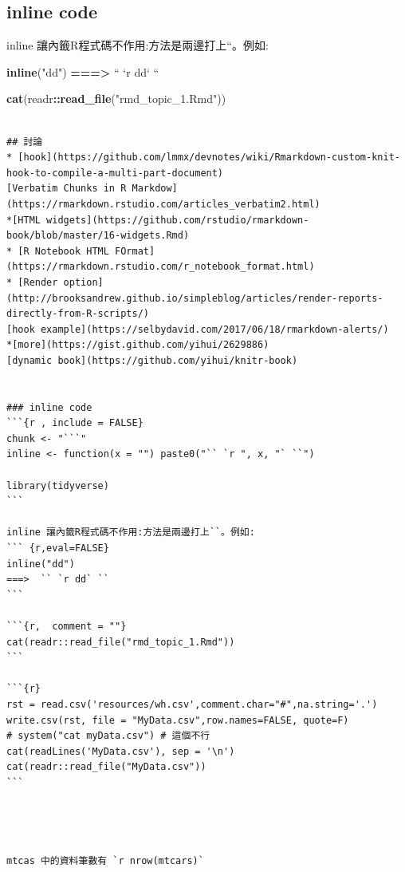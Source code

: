 \documentclass[]{book}
\newenvironment{Shaded}{\begin{snugshade}}{\end{snugshade}}
\newcommand{\DataTypeTok}[1]{\textcolor[rgb]{0.13,0.29,0.53}{#1}}
\newcommand{\ErrorTok}[1]{\textcolor[rgb]{0.64,0.00,0.00}{\textbf{#1}}}
\newcommand{\KeywordTok}[1]{\textcolor[rgb]{0.13,0.29,0.53}{\textbf{#1}}}
\newcommand{\NormalTok}[1]{#1}
\newcommand{\OperatorTok}[1]{\textcolor[rgb]{0.81,0.36,0.00}{\textbf{#1}}}
\newcommand{\StringTok}[1]{\textcolor[rgb]{0.31,0.60,0.02}{#1}}
\theoremstyle{definition}
\theoremstyle{definition}
\theoremstyle{definition}
\theoremstyle{remark}
\begin{document}
\hypertarget{inline-code}{%
\subsection{inline code}\label{inline-code}}

inline 讓內籤R程式碼不作用:方法是兩邊打上``。例如:

\begin{Shaded}
\begin{Highlighting}[]
\KeywordTok{inline}\NormalTok{(}\StringTok{"dd"}\NormalTok{)}
\OperatorTok{==}\ErrorTok{=>}\StringTok{  ``} \StringTok{`}\DataTypeTok{r dd}\StringTok{`} \StringTok{``}
\end{Highlighting}
\end{Shaded}

\begin{Shaded}
\begin{Highlighting}[]
\KeywordTok{cat}\NormalTok{(readr}\OperatorTok{::}\KeywordTok{read_file}\NormalTok{(}\StringTok{"rmd_topic_1.Rmd"}\NormalTok{))}
\end{Highlighting}
\end{Shaded}

\begin{verbatim}

## 討論
* [hook](https://github.com/lmmx/devnotes/wiki/Rmarkdown-custom-knit-hook-to-compile-a-multi-part-document)  
[Verbatim Chunks in R Markdow](https://rmarkdown.rstudio.com/articles_verbatim2.html)  
*[HTML widgets](https://github.com/rstudio/rmarkdown-book/blob/master/16-widgets.Rmd)  
* [R Notebook HTML FOrmat](https://rmarkdown.rstudio.com/r_notebook_format.html)  
* [Render option](http://brooksandrew.github.io/simpleblog/articles/render-reports-directly-from-R-scripts/)
[hook example](https://selbydavid.com/2017/06/18/rmarkdown-alerts/)  
*[more](https://gist.github.com/yihui/2629886)  
[dynamic book](https://github.com/yihui/knitr-book)


### inline code 
```{r , include = FALSE}
chunk <- "```"
inline <- function(x = "") paste0("`` `r ", x, "` ``")

library(tidyverse)
```

inline 讓內籤R程式碼不作用:方法是兩邊打上``。例如:
``` {r,eval=FALSE}
inline("dd")
===>  `` `r dd` ``
```

```{r,  comment = ""}
cat(readr::read_file("rmd_topic_1.Rmd"))
```

```{r} 
rst = read.csv('resources/wh.csv',comment.char="#",na.string='.')
write.csv(rst, file = "MyData.csv",row.names=FALSE, quote=F)
# system("cat myData.csv") # 這個不行
cat(readLines('MyData.csv'), sep = '\n')
cat(readr::read_file("MyData.csv"))
```


 

mtcas 中的資料筆數有 `r nrow(mtcars)`
\end{verbatim}
\end{document}
